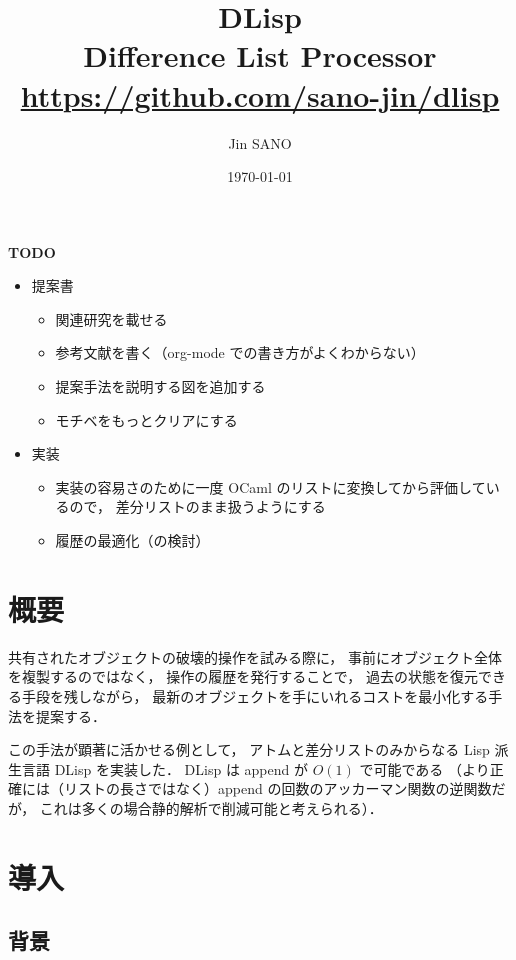 \documentclass[10pt, a4j, twocolumn]{scrartcl}
\author{Jin SANO}
\date{\today}
\title{DLisp\\\medskip
\large Difference List Processor \\ \url{https://github.com/sano-jin/dlisp}}
\begin{document}
\maketitle
\tableofcontents

\vspace{1em}

\textbf{\textbf{TODO}} 

\begin{itemize}
\item 提案書
\begin{itemize}
\item 関連研究を載せる
\item 参考文献を書く（org-mode での書き方がよくわからない）
\item 提案手法を説明する図を追加する
\item モチベをもっとクリアにする
\end{itemize}

\item 実装
\begin{itemize}
\item 実装の容易さのために一度 OCaml のリストに変換してから評価しているので，
差分リストのまま扱うようにする
\item 履歴の最適化（の検討）
\end{itemize}
\end{itemize}


\section{概要}
\label{sec:org362503a}

共有されたオブジェクトの破壊的操作を試みる際に，
事前にオブジェクト全体を複製するのではなく，
操作の履歴を発行することで，
過去の状態を復元できる手段を残しながら，
最新のオブジェクトを手にいれるコストを最小化する手法を提案する．

この手法が顕著に活かせる例として，
アトムと差分リストのみからなる Lisp 派生言語 DLisp を実装した．
DLisp は append が \(O(1)\) で可能である
（より正確には（リストの長さではなく）append の回数のアッカーマン関数の逆関数だが，
これは多くの場合静的解析で削減可能と考えられる）．


\section{導入}
\label{sec:orga4e8695}

\subsection{背景}
\label{sec:org7cb7ed8}
\end{document}
